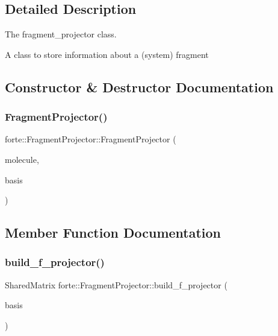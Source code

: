 \subsection{Detailed Description}
The fragment\+\_\+projector class. 

A class to store information about a (system) fragment 

\subsection{Constructor \& Destructor Documentation}
\mbox{\label{classforte_1_1_fragment_projector_aa66efdff21a75ad8f77beb72c166a45c}} 
\subsubsection{\texorpdfstring{Fragment\+Projector()}{FragmentProjector()}}
{\footnotesize\ttfamily forte\+::\+Fragment\+Projector\+::\+Fragment\+Projector (\begin{DoxyParamCaption}\item[{std\+::shared\+\_\+ptr$<$ psi\+::\+Molecule $>$}]{molecule,  }\item[{std\+::shared\+\_\+ptr$<$ psi\+::\+Basis\+Set $>$}]{basis }\end{DoxyParamCaption})}



\subsection{Member Function Documentation}
\mbox{\label{classforte_1_1_fragment_projector_aae8790c8c1aefadaedf74007ffc459bc}} 
\subsubsection{\texorpdfstring{build\+\_\+f\+\_\+projector()}{build\_f\_projector()}}
{\footnotesize\ttfamily Shared\+Matrix forte\+::\+Fragment\+Projector\+::build\+\_\+f\+\_\+projector (\begin{DoxyParamCaption}\item[{std\+::shared\+\_\+ptr$<$ psi\+::\+Basis\+Set $>$}]{basis }\end{DoxyParamCaption})}

